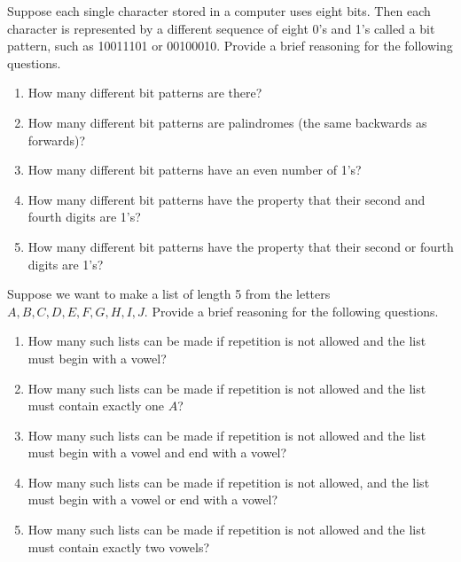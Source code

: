 \documentclass{article}
\theoremstyle{definition}
\begin{document}
\begin{question}
    Suppose each single character stored in a computer uses eight bits. 
    Then each character is represented by a different sequence of eight 0's and 1's called a bit pattern, 
    such as 10011101 or 00100010. Provide a brief reasoning for the following questions.
        \begin{enumerate}
            \item How many different bit patterns are there?
            \item How many different bit patterns are palindromes (the same backwards as forwards)?
            \item How many different bit patterns have an even number of 1's?
            \item How many different bit patterns have the property that their second and fourth digits are 1's?
            \item How many different bit patterns have the property that their second or fourth digits are 1's?
        \end{enumerate}
\end{question}
\begin{solution}
\end{solution}

\begin{question}
    Suppose we want to make a list of length 5 from the letters $A, B, C, D, E, F, G, H, I, J$. Provide a brief reasoning for the following questions.
        \begin{enumerate}
            \item How many such lists can be made if repetition is not allowed and the list must begin with a vowel?
            \item How many such lists can be made if repetition is not allowed and the list must contain exactly one $A$?
            \item How many such lists can be made if repetition is not allowed and the list must begin with a vowel and end with a vowel?
            \item How many such lists can be made if repetition is not allowed, and the list must begin with a vowel or end with a vowel?
            \item How many such lists can be made if repetition is not allowed and the list must contain exactly two vowels?
        \end{enumerate}
\end{question}
\begin{solution}
\end{solution}
\end{document}
